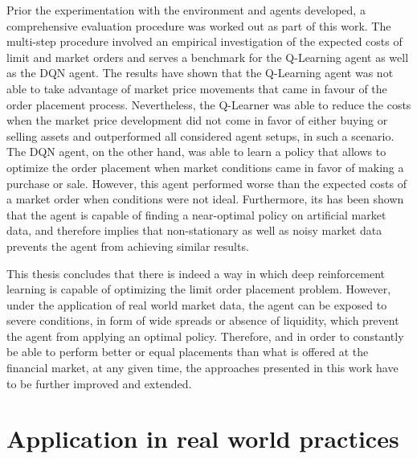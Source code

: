 Prior the experimentation with the environment and agents developed, a comprehensive evaluation procedure was worked out as part of this work.
The multi-step procedure involved an empirical investigation of the expected costs of limit and market orders and serves a benchmark for the Q-Learning agent as well as the DQN agent.
The results have shown that the Q-Learning agent was not able to take advantage of market price movements that came in favour of the order placement process.
Nevertheless, the Q-Learner was able to reduce the costs when the market price development did not come in favor of either buying or selling assets and outperformed all considered agent setups, in such a scenario.
The DQN agent, on the other hand, was able to learn a policy that allows to optimize the order placement when market conditions came in favor of making a purchase or sale.
However, this agent performed worse than the expected costs of a market order when conditions were not ideal.
Furthermore, its has been shown that the agent is capable of finding a near-optimal policy on artificial market data, and therefore implies that non-stationary as well as noisy market data prevents the agent from achieving similar results.

This thesis concludes that there is indeed a way in which deep reinforcement learning is capable of optimizing the limit order placement problem.
However, under the application of real world market data, the agent can be exposed to severe conditions, in form of wide spreads or absence of liquidity, which prevent the agent from applying an optimal policy.
Therefore, and in order to constantly be able to perform better or equal placements than what is offered at the financial market, at any given time, the approaches presented in this work have to be further improved and extended.

\section{Application in real world practices}

